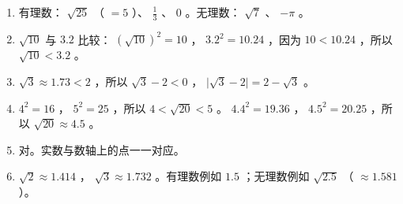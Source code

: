 \begin{answer}
\begin{enumerate}
  \item 有理数： $\sqrt{25}$ （ $= 5$ ）、 $\frac{1}{3}$ 、 $0$ 。无理数： $\sqrt{7}$ 、 $-\pi$ 。
  \item $\sqrt{10}$ 与 $3.2$ 比较： $(\sqrt{10})^2 = 10$ ， $3.2^2 = 10.24$ ，因为 $10 < 10.24$ ，所以 $\sqrt{10} < 3.2$ 。
  \item $\sqrt{3} \approx 1.73 < 2$ ，所以 $\sqrt{3} - 2 < 0$ ， $\lvert \sqrt{3} - 2 \rvert = 2 - \sqrt{3}$ 。
  \item $4^2 = 16$ ， $5^2 = 25$ ，所以 $4 < \sqrt{20} < 5$ 。 $4.4^2 = 19.36$ ， $4.5^2 = 20.25$ ，所以 $\sqrt{20} \approx 4.5$ 。
  \item 对。实数与数轴上的点一一对应。
  \item $\sqrt{2} \approx 1.414$ ， $\sqrt{3} \approx 1.732$ 。有理数例如 $1.5$ ；无理数例如 $\sqrt{2.5}$ （ $\approx 1.581$ ）。
\end{enumerate}


\end{answer}
